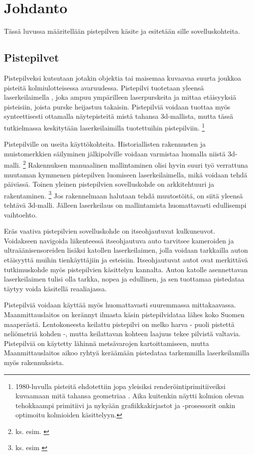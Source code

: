 \section{Johdanto}
Tässä luvussa määritellään pistepilven käsite ja esitetään sille sovelluskohteita.


\subsection{Pistepilvet}

Pistepilveksi kutsutaan jotakin objektia tai maisemaa kuvaavaa suurta joukkoa pisteitä kolmiulotteisessa avaruudessa. Pistepilvi tuotetaan yleensä laserkeilaimella , joka ampuu ympärilleen laserpurskeita ja mittaa etäisyyksiä pisteisiin, joista purske heijastuu takaisin. Pistepilviä voidaan tuottaa myös synteettisesti ottamalla näytepisteitä mistä tahansa 3d-mallista, mutta tässä tutkielmassa keskitytään laserkeilaimilla tuotettuihin pistepilviin. \footnote{1980-luvulla pisteitä ehdotettiin jopa yleisiksi renderöintiprimitiiveiksi kuvaamaan mitä tahansa geometriaa \cite{Whitted}. Aika kuitenkin näytti kolmion olevan tehokkaampi primitiivi ja nykyään grafiikkakirjastot ja -prosessorit onkin optimoitu kolmioiden käsittelyyn.}

Pistepilville on useita käyttökohteita. Historiallisten rakennusten ja muistomerkkien säilyminen jälkipolville voidaan varmistaa luomalla niistä 3d-malli. \footnote{ks. esim. \cite{Kersten}} Rakennuksen manuaalinen mallintaminen olisi hyvin suuri työ verrattuna muutaman kymmenen pistepilven luomiseen laserkeilaimella, mikä voidaan tehdä päivässä. Toinen yleinen pistepilvien sovelluskohde on arkkitehtuuri ja rakentaminen. \footnote{ks. esim \cite{silta}} Jos rakennelmaan halutaan tehdä muutostöitä, on siitä yleensä tehtävä 3d-malli. Jälleen laserkeilaus on mallintamista huomattavasti edullisempi vaihtoehto.

Eräs vaativa pistepilvien sovelluskohde on itseohjautuvat kulkuneuvot. Voidakseen navigoida liikenteessä itseohjautuva auto tarvitsee kameroiden ja ultraäänisensoreiden lisäksi katollen laserkeilaimen, jolla voidaan tarkkailla auton etäisyyttä muihin tienkäyttäjiin ja esteisiin. Itseohjautuvat autot ovat merkittävä tutkimuskohde myös pistepilvien käsittelyn kannalta. Auton katolle asennettavan laserkeilaimen tulisi olla tarkka, nopea ja edullinen, ja sen tuottamaa pistedataa täytyy voida käsitellä reaaliajassa. \cite{car} 

Pistepilviä voidaan käyttää myös huomattavasti suuremmassa mittakaavassa. Maanmittauslaitos on kerännyt ilmasta käsin pistepilvidataa lähes koko Suomen maaperästä. Lentokoneesta keilattu pistepilvi on melko harva - puoli pistettä neliömetriä kohden -, mutta keilattavan kohteen laajuus tekee pilvistä valtavia. Pistepilviä on käytetty lähinnä metsävarojen kartoittamiseen, mutta Maanmittauslaitos aikoo ryhtyä keräämään pistedataa tarkemmilla laserkeilamilla myös rakennuksista. \cite{hs}


